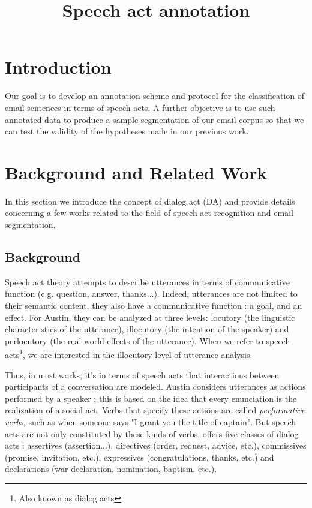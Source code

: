 \documentclass[11pt]{article}
\begin{document}
\title{Speech act annotation}

\begin{titlepage}

\maketitle

\tableofcontents

\end{titlepage}

\section{Introduction}

Our goal is to develop an annotation scheme and protocol for the classification of email sentences in terms of speech acts. A further objective is to use such annotated data to produce a sample segmentation of our email corpus so that we can test the validity of the hypotheses made in our previous work.

\section{Background and Related Work}

In this section we introduce the concept of dialog act (DA) and provide details concerning a few works related to the field of speech act recognition and email segmentation.

\subsection{Background}

Speech act theory \cite{austin1975things} attempts to describe utterances in terms of communicative function (e.g. question, answer, thanks...). Indeed, utterances are not limited to their semantic content, they also have a communicative function : a goal, and an effect. For Austin, they can be analyzed at three levels: locutory (the linguistic characteristics of the utterance), illocutory (the intention of the speaker) and perlocutory (the real-world effects of the utterance). When we refer to speech acts\footnote{Also known as dialog acts}, we are interested in the illocutory level of utterance analysis. 

Thus, in most works, it's in terms of speech acts that interactions between participants of a conversation are modeled. Austin considers utterances as actions performed by a speaker ; this is based on the idea that every enunciation is the realization of a social act. Verbs that specify these actions are called \textit{performative verbs}, such as when someone says "I grant you the title of captain". But speech acts are not only constituted by these kinds of verbs. \cite{searle1976taxonomy} offers five classes of dialog acts : assertives (assertion...), directives (order, request, advice, etc.), commissives (promise, invitation, etc.), expressives (congratulations, thanks, etc.) and declarations (war declaration, nomination, baptism, etc.).
\end{document}
